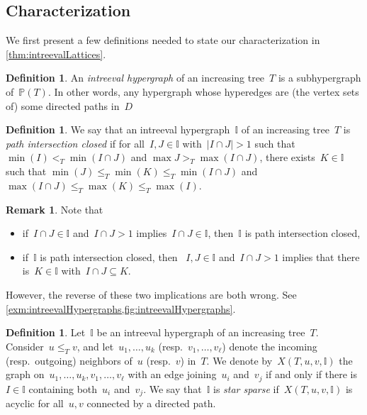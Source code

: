\documentclass{amsart}
\theoremstyle{definition}
\newtheorem{definition}[theorem]{Definition}
\newtheorem{remark}[theorem]{Remark}
\newcommand{\darkblue}{\color{darkblue}} %
\newcommand{\defn}[1]{\textsl{\darkblue #1}} %
\newcommand{\II}{\mathbb I} %
\newcommand{\PP}{\mathbb P} %
\begin{document}

\subsection{Characterization}
\label{subsec:characterization}

We first present a few definitions needed to state our characterization in \cref{thm:intreevalLattices}.

\begin{definition}
An \defn{intreeval hypergraph} of an increasing tree~$T$ is a subhypergraph of~$\PP(T)$.
In other words, any hypergraph whose hyperedges are (the vertex sets of) some directed paths in~$D$
\end{definition}

\begin{definition} 
\label{def:pathIntersectionClose}
We say that an intreeval hypergraph~$\II$ of an increasing tree~$T$ is \defn{path intersection closed} if for all~$I,J\in \II$ with~$|I\cap J|> 1$ such that $\min(I) <_T \min(I\cap J)$ and  $\max J >_T \max (I\cap J)$, there exists~$K \in \II$ such that $\min(J) \le_T \min(K) \le_T \min(I\cap J)$ and ${\max(I\cap J) \le_T \max(K) \le_T \max(I)}$.
\end{definition}

\begin{remark}
Note that
\begin{itemize}
\item if~$I \cap J \in \II$ and~$I \cap J > 1$ implies~$I \cap J \in \II$, then~$\II$ is path intersection closed,
\item if~$\II$ is path intersection closed, then ~$I,J \in \II$ and~$I \cap J > 1$ implies that there is~$K \in \II$ with~$I \cap J \subseteq K$.
\end{itemize}
However, the reverse of these two implications are both wrong.
See \cref{exm:intreevalHypergraphs,fig:intreevalHypergraphs}.
\end{remark}

\begin{definition}
\label{def:pathStarSparse}
Let~$\II$ be an intreeval hypergraph of an increasing tree~$T$.
Consider~$u \le_T v$, and let~$u_1, \dots, u_k$ (resp.~$v_1, \dots, v_\ell$) denote the incoming (resp.~outgoing) neighbors of~$u$ (resp.~$v$) in~$T$.
We denote by~$X(T,u,v,\II)$ the graph on~$u_1, \dots, u_k, v_1, \dots, v_\ell$ with an edge joining~$u_i$ and~$v_j$ if and only if there is~$I \in \II$ containing both~$u_i$ and~$v_j$.
We say that~$\II$ is \defn{star sparse} if~$X(T,u,v,\II)$ is acyclic for all~$u,v$ connected by a directed path.
\end{definition}
\end{document}
